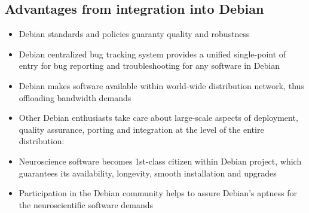 \documentclass[letterpaper,landscape]{report}
\begin{document}
\begin{multicols}{3}
\section*{Advantages from integration into Debian}

\begin{itemize}[nolistsep,leftmargin=1pc]

\item Debian standards and policies guaranty quality and robustness

\item Debian centralized bug tracking system provides a unified
  single-point of entry for bug reporting and troubleshooting for any
  software in Debian

\item Debian makes software available within world-wide distribution
  network, thus offloading bandwidth demands

\item Other Debian enthusiasts take care about large-scale aspects of
  deployment, quality assurance, porting and integration at the level
  of the entire distribution:


\item Neuroscience software becomes 1st-class citizen within Debian
  project, which guarantees its availability, longevity, smooth
  installation and upgrades

\item Participation in the Debian community helps to assure Debian's
  aptness for the neuroscientific software demands

\end{itemize}



\end{multicols}
\end{document}
